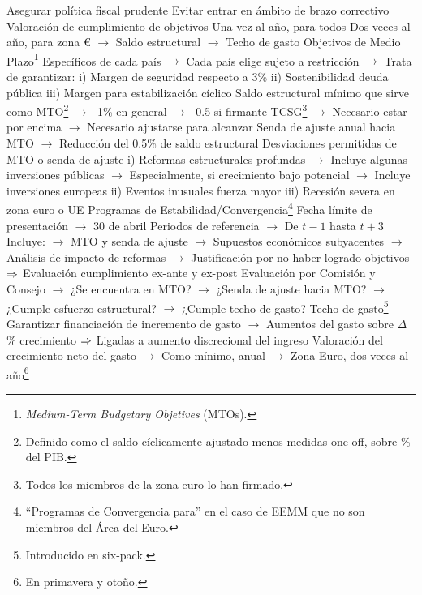 \documentclass{nuevotema}
\begin{document}
\begin{esquemal}
				\4 Asegurar política fiscal prudente
				\4[] Evitar entrar en ámbito de brazo correctivo
				\4 Valoración de cumplimiento de objetivos
				\4[] Una vez al año, para todos
				\4[] Dos veces al año, para zona €
				\4[] $\to$ Saldo estructural
				\4[] $\to$ Techo de gasto
				\4 Objetivos de Medio Plazo\footnote{\textit{Medium-Term Budgetary Objetives} (MTOs).}
				\4[] Específicos de cada país
				\4[] $\to$ Cada país elige sujeto a restricción
				\4[] $\to$ Trata de garantizar:
				\4[] \quad i) Margen de seguridad respecto a 3\%
				\4[] \quad ii) Sostenibilidad deuda pública
				\4[] \quad iii) Margen para estabilización cíclico
				\4[] Saldo estructural mínimo que sirve como MTO\footnote{Definido como el saldo cíclicamente ajustado menos medidas one-off, sobre \% del PIB.}
				\4[] $\to$ -1\% en general
				\4[] $\to$ -0.5 si firmante TCSG\footnote{Todos los miembros de la zona euro lo han firmado.}
				\4[] $\to$ Necesario estar por encima
				\4[] $\to$ Necesario ajustarse para alcanzar
				\4[] Senda de ajuste anual hacia MTO
				\4[] $\to$ Reducción del 0.5\% de saldo estructural
				\4[] Desviaciones permitidas de MTO o senda de ajuste
				\4[] i) Reformas estructurales profundas
				\4[] $\to$ Incluye algunas inversiones públicas
				\4[] $\to$ Especialmente, si crecimiento bajo potencial
				\4[] $\to$ Incluye inversiones europeas
				\4[] ii) Eventos inusuales fuerza mayor
				\4[] iii) Recesión severa en zona euro o UE
				\4 Programas de Estabilidad/Convergencia\footnote{``Programas de Convergencia para'' en el caso de EEMM que no son miembros del Área del Euro.}
				\4[] Fecha límite de presentación
				\4[] $\to$ 30 de abril
				\4[] Periodos de referencia
				\4[] $\to$ De $t-1$ hasta $t+3$
				\4[] Incluye:
				\4[] $\to$ MTO y senda de ajuste
				\4[] $\to$ Supuestos económicos subyacentes
				\4[] $\to$ Análisis de impacto de reformas
				\4[] $\to$ Justificación por no haber logrado objetivos
				\4[] $\Rightarrow$ Evaluación cumplimiento ex-ante y ex-post
				\4[] Evaluación por Comisión y Consejo
				\4[] $\to$ ¿Se encuentra en MTO?
				\4[] $\to$ ¿Senda de ajuste hacia MTO?
				\4[] $\to$ ¿Cumple esfuerzo estructural?
				\4[] $\to$ ¿Cumple techo de gasto?
				\4 Techo de gasto\footnote{Introducido en six-pack.}
				\4[] Garantizar financiación de incremento de gasto
				\4[] $\to$ Aumentos del gasto sobre $\Delta$ \% crecimiento
				\4[] $\Rightarrow$ Ligadas a aumento discrecional del ingreso
				\4[] Valoración del crecimiento neto del gasto
				\4[] $\to$ Como mínimo, anual
				\4[] $\to$ Zona Euro, dos veces al año\footnote{En primavera y otoño.}

\end{esquemal}
\end{document}
